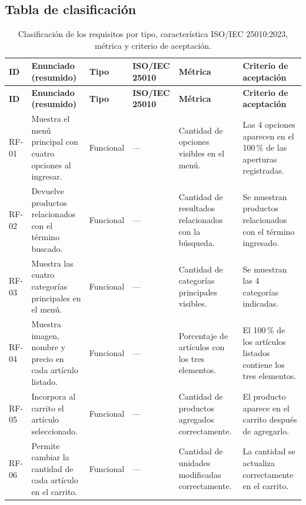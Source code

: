 \documentclass[11pt,a4paper]{article}
\begin{document}
\begin{landscape}
\section{Tabla de clasificación}
\label{sec:clasificacion}

\begin{longtable}{>{\raggedright\arraybackslash}p{1.2cm}
                  >{\raggedright\arraybackslash}p{6.4cm}
                  >{\raggedright\arraybackslash}p{2.4cm}
                  >{\raggedright\arraybackslash}p{4.2cm}
                  >{\raggedright\arraybackslash}p{3.8cm}
                  >{\raggedright\arraybackslash}p{4.2cm}}
\caption{Clasificación de los requisitos por tipo, característica
ISO/IEC 25010:2023, métrica y criterio de aceptación.}
\label{tab:clasificacion}\\
\toprule
\textbf{ID} & \textbf{Enunciado (resumido)} & \textbf{Tipo} &
\textbf{ISO/IEC 25010} & \textbf{Métrica} & \textbf{Criterio de aceptación} \\
\midrule
\endfirsthead
\toprule
\textbf{ID} & \textbf{Enunciado (resumido)} & \textbf{Tipo} &
\textbf{ISO/IEC 25010} & \textbf{Métrica} & \textbf{Criterio de aceptación} \\
\midrule
\endhead
\bottomrule
\endfoot
RF-01 & Muestra el menú principal con cuatro opciones al ingresar. & Funcional & --- & Cantidad de opciones visibles en el menú. & Las 4 opciones aparecen en el 100\,\% de las aperturas registradas. \\
RF-02 & Devuelve productos relacionados con el término buscado. & Funcional & --- & Cantidad de resultados relacionados con la búsqueda. & Se muestran productos relacionados con el término ingresado. \\
RF-03 & Muestra las cuatro categorías principales en el menú. & Funcional & --- & Cantidad de categorías principales visibles. & Se muestran las 4 categorías indicadas. \\
RF-04 & Muestra imagen, nombre y precio en cada artículo listado. & Funcional & --- & Porcentaje de artículos con los tres elementos. & El 100\,\% de los artículos listados contiene los tres elementos. \\
RF-05 & Incorpora al carrito el artículo seleccionado. & Funcional & --- & Cantidad de productos agregados correctamente. & El producto aparece en el carrito después de agregarlo. \\
RF-06 & Permite cambiar la cantidad de cada artículo en el carrito. & Funcional & --- & Cantidad de unidades modificadas correctamente. & La cantidad se actualiza correctamente en el carrito. \\

\end{longtable}
\end{landscape}
\end{document}
